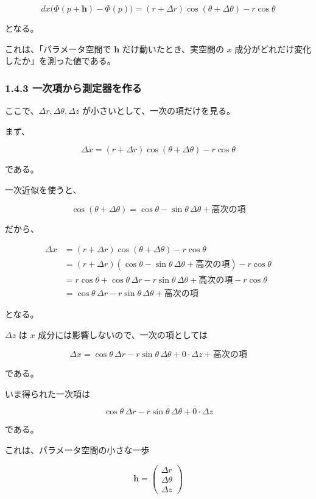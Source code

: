 \documentclass[a4paper,12pt,openany]{book}
\begin{document}
\[
dx\bigl(\Phi(p+\mathbf h)-\Phi(p)\bigr)
=
(r+\Delta r)\cos(\theta+\Delta\theta)-r\cos\theta
\]

となる。

これは、「パラメータ空間で \(\mathbf h\) だけ動いたとき、実空間の \(x\)
成分がどれだけ変化したか」を測った値である。

\hypertarget{ux4e00ux6b21ux9805ux304bux3089ux6e2cux5b9aux5668ux3092ux4f5cux308b}{%
\subsubsection{1.4.3
一次項から測定器を作る}\label{ux4e00ux6b21ux9805ux304bux3089ux6e2cux5b9aux5668ux3092ux4f5cux308b}}

ここで、\(\Delta r,\Delta\theta,\Delta z\)
が小さいとして、一次の項だけを見る。

まず、

\[
\Delta x
=
(r+\Delta r)\cos(\theta+\Delta\theta)-r\cos\theta
\]

である。

一次近似を使うと、

\[
\cos(\theta+\Delta\theta)
=
\cos\theta-\sin\theta\,\Delta\theta
+
\text{高次の項}
\]

だから、

\[
\begin{aligned}
\Delta x
&=
(r+\Delta r)\cos(\theta+\Delta\theta)-r\cos\theta\\
&=
(r+\Delta r)(\cos\theta-\sin\theta\,\Delta\theta+\text{高次の項})-r\cos\theta\\
&=
r\cos\theta
+\cos\theta\,\Delta r
-r\sin\theta\,\Delta\theta
+\text{高次の項}
-r\cos\theta\\
&=
\cos\theta\,\Delta r
-r\sin\theta\,\Delta\theta
+\text{高次の項}
\end{aligned}
\]

となる。

\(\Delta z\) は \(x\) 成分には影響しないので、一次の項としては

\[
\Delta x
=
\cos\theta\,\Delta r
-r\sin\theta\,\Delta\theta
+0\cdot\Delta z
+
\text{高次の項}
\]

である。

いま得られた一次項は

\[
\cos\theta\,\Delta r
-r\sin\theta\,\Delta\theta
+0\cdot\Delta z
\]

である。

これは、パラメータ空間の小さな一歩

\[
\mathbf h
=
\begin{pmatrix}
\Delta r\\
\Delta\theta\\
\Delta z
\end{pmatrix}
\]
\end{document}

